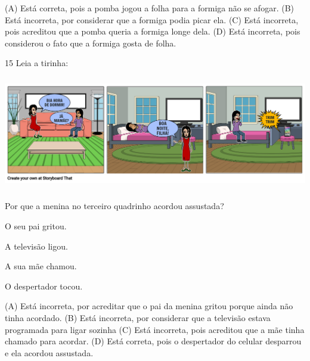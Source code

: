 
(A) Está correta, pois a pomba jogou a folha para a formiga não se afogar.
(B) Está incorreta, por considerar que a formiga podia picar ela.
(C) Está incorreta, pois acreditou que a pomba queria a formiga longe dela.
(D) Está incorreta, pois considerou o fato que a formiga gosta de folha.

\num{15} Leia a tirinha:

\includegraphics[width=5.90556in,height=1.95694in]{media/image172.png}


Por que a menina no terceiro quadrinho acordou assustada?

\begin{minipage}{.5\textwidth}
\begin{escolha}
\item O seu pai gritou.

\item A televisão ligou.

\item A sua mãe chamou.

\item O despertador tocou.
\end{escolha}
\end{minipage}

(A) Está incorreta, por acreditar que o pai da menina gritou porque ainda não tinha acordado.
(B) Está incorreta, por considerar que a televisão estava programada para ligar sozinha
(C) Está incorreta, pois acreditou que a mãe tinha chamado para acordar.
(D) Está correta, pois o despertador do celular desparrou e ela acordou assustada.

